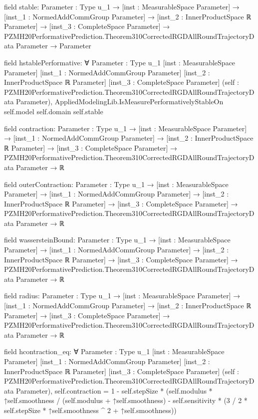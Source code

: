 \documentclass[10pt]{article}
\begin{document}
\begin{ReviewVerbatim}
field stable:
{Parameter : Type u_1} →
  [inst : MeasurableSpace Parameter] →
    [inst_1 : NormedAddCommGroup Parameter] →
      [inst_2 : InnerProductSpace ℝ Parameter] →
        [inst_3 : CompleteSpace Parameter] →
          PZMH20PerformativePrediction.Theorem310CorrectedRGDAllRoundTrajectoryData Parameter → Parameter

field hstablePerformative:
∀ {Parameter : Type u_1} [inst : MeasurableSpace Parameter] [inst_1 : NormedAddCommGroup Parameter]
  [inst_2 : InnerProductSpace ℝ Parameter] [inst_3 : CompleteSpace Parameter]
  (self : PZMH20PerformativePrediction.Theorem310CorrectedRGDAllRoundTrajectoryData Parameter),
  AppliedModelingLib.IsMeasurePerformativelyStableOn self.model self.domain self.stable

field contraction:
{Parameter : Type u_1} →
  [inst : MeasurableSpace Parameter] →
    [inst_1 : NormedAddCommGroup Parameter] →
      [inst_2 : InnerProductSpace ℝ Parameter] →
        [inst_3 : CompleteSpace Parameter] →
          PZMH20PerformativePrediction.Theorem310CorrectedRGDAllRoundTrajectoryData Parameter → ℝ

field outerContraction:
{Parameter : Type u_1} →
  [inst : MeasurableSpace Parameter] →
    [inst_1 : NormedAddCommGroup Parameter] →
      [inst_2 : InnerProductSpace ℝ Parameter] →
        [inst_3 : CompleteSpace Parameter] →
          PZMH20PerformativePrediction.Theorem310CorrectedRGDAllRoundTrajectoryData Parameter → ℝ

field wassersteinBound:
{Parameter : Type u_1} →
  [inst : MeasurableSpace Parameter] →
    [inst_1 : NormedAddCommGroup Parameter] →
      [inst_2 : InnerProductSpace ℝ Parameter] →
        [inst_3 : CompleteSpace Parameter] →
          PZMH20PerformativePrediction.Theorem310CorrectedRGDAllRoundTrajectoryData Parameter → ℝ

field radius:
{Parameter : Type u_1} →
  [inst : MeasurableSpace Parameter] →
    [inst_1 : NormedAddCommGroup Parameter] →
      [inst_2 : InnerProductSpace ℝ Parameter] →
        [inst_3 : CompleteSpace Parameter] →
          PZMH20PerformativePrediction.Theorem310CorrectedRGDAllRoundTrajectoryData Parameter → ℝ

field hcontraction_eq:
∀ {Parameter : Type u_1} [inst : MeasurableSpace Parameter] [inst_1 : NormedAddCommGroup Parameter]
  [inst_2 : InnerProductSpace ℝ Parameter] [inst_3 : CompleteSpace Parameter]
  (self : PZMH20PerformativePrediction.Theorem310CorrectedRGDAllRoundTrajectoryData Parameter),
  self.contraction =
    1 -
      self.stepSize *
        (self.modulus * ↑self.smoothness / (self.modulus + ↑self.smoothness) -
          self.sensitivity * (3 / 2 * self.stepSize * ↑self.smoothness ^ 2 + ↑self.smoothness))


\end{ReviewVerbatim}
\end{document}
